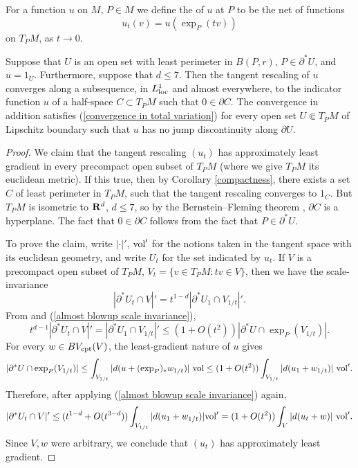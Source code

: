 \begin{definition}
For a function $u$ on $M$, $P \in M$ we define the  of $u$ at $P$ to be the net of functions
$$u_t(v) = u\left(\exp_P(tv)\right)$$
on $T_PM$, as $t \to 0$.
\end{definition}

\begin{proposition}\label{blowup theorem}
Suppose that $U$ is an open set with least perimeter in $B(P, r)$, $P \in \partial^* U$, and $u = 1_U$.
Furthermore, suppose that $d \leq 7$.
Then the tangent rescaling of $u$ converges along a subsequence, in $L^1_{\mathrm{loc}}$ and almost everywhere, to the indicator function $u$ of a half-space $C \subset T_PM$ such that $0 \in \partial C$.
The convergence in addition satisfies (\ref{convergence in total variation}) for every open set $U \Subset T_PM$ of Lipschitz boundary such that $u$ has no jump discontinuity along $\partial U$.
\end{proposition}
\begin{proof}
We claim that the tangent rescaling $(u_t)$ has approximately least gradient in every precompact open subset of $T_PM$ (where we give $T_PM$ its euclidean metric). If this true, then by Corollary \ref{compactness}, there exists a set $C$ of least perimeter in $T_PM$, such that the tangent rescaling converges to $1_C$.
But $T_PM$ is isometric to $\mathbf{R}^d$, $d \leq 7$, so by the Bernstein--Fleming theorem \cite[Theorem 17.3]{Giusti77} \cite[\S5]{Fleming62}, $\partial C$ is a hyperplane.
The fact that $0 \in \partial C$ follows from the fact that $P \in \partial^* U$.

To prove the claim, write $|\cdot|'$, $\mathrm{vol}'$ for the notions taken in the tangent space with its euclidean geometry, and write $U_t$ for the set indicated by $u_t$.
If $V$ is a precompact open subset of $T_PM$, $V_t = \{v \in T_PM: tv \in V\}$, then we have the scale-invariance
\begin{equation}\label{almost blowup scale invariance}
|\partial^* U_t \cap V|' = t^{1 - d}|\partial^* U_1 \cap V_{1/t}|'.
\end{equation}
From \cite[Lemma 3.4]{schoen1994lectures} and (\ref{almost blowup scale invariance}),
$$t^{d - 1} |\partial^* U_t \cap V|' = |\partial^* U_1 \cap V_{1/t}|' \leq (1 + O(t^2)) |\partial^* U \cap \exp_P(V_{1/t})|.$$
For every $w \in BV_{\mathrm{cpt}}(V)$, the least-gradient nature of $u$ gives
$$|\partial^* U \cap \exp_P(V_{1/t})| \leq \int_{V_{1/t}} |d(u + (\exp_P)_* w_{1/t})| ~\mathrm{vol} \leq (1 + O(t^2))\int_{V_{1/t}} |d(u_1 + w_{1/t})| ~\mathrm{vol}'.$$
Therefore, after applying (\ref{almost blowup scale invariance}) again,
$$|\partial^* U_t \cap V|' \leq (t^{1 - d} + O(t^{3 - d})) \int_{V_{1/t}} |d(u_1 + w_{1/t})| \mathrm{vol}' = (1 + O(t^2)) \int_V |d(u_t + w)| ~\mathrm{vol}'.$$
Since $V,w$ were arbitrary, we conclude that $(u_t)$ has approximately least gradient.
\end{proof}
